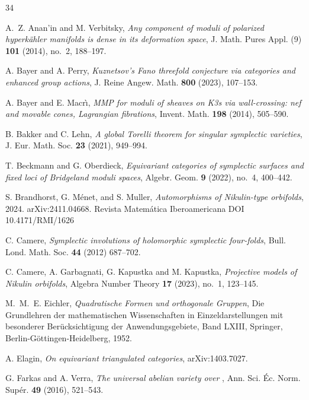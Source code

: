 \documentclass{amsart}
\makeatletter
\theoremstyle{definition}
\numberwithin{equation}{section}
\numberwithin{equation}{section} \theoremstyle{definition}
\newcounter{mathrecordid}
\newcommand{\mathboxbegin}[1]{%
  \stepcounter{mathrecordid}%
  \immediate\write\mathrecords{\themathrecordid,#1}%
  \special{pdf:bann << /Type /Annot /Subtype /Link /Border [0 0 0]
    /MathBoxID \themathrecordid /F 2
    /A << /S /URI /URI (urn:mathbox:\themathrecordid) >> >>}}
\newcommand{\mathboxinlineplain}[1]{$#1$}
\newcommand{\mathboxinline}[1]{%
  $\mathboxbegin{inline}%
  \special{pdf:literal direct /MathBoxBegin\themathrecordid\space MP}%
  #1\special{pdf:literal direct /MathBoxEnd\themathrecordid\space MP}%
  \special{pdf:eann}$}
\newcommand{\recordmath}{%
  \ifmeasuring@\expandafter\mathboxinlineplain
  \else\expandafter\mathboxinline\fi}
\makeatother
\begin{document}
\begin{thebibliography}{34}

 A.~Z. Anan'in and M. Verbitsky,
  \emph{Any component of moduli of polarized hyperk\"ahler manifolds is dense
  in its deformation space}, J. Math. Pures Appl. (9) {\bf 101} (2014),
  no.~2, 188--197.

 A. Bayer and A. Perry,
  \emph{Kuznetsov's Fano threefold conjecture via \recordmath{K3} categories and enhanced
  group actions}, J. Reine Angew. Math. {\bf 800} (2023), 107--153.

 A. Bayer and E. Macr\`\i,
  \emph{MMP for moduli of sheaves on K3s via wall-crossing: nef and movable
  cones, Lagrangian fibrations}, Invent. Math. {\bf 198} (2014), 505--590.



 B. Bakker and C. Lehn,
  \emph{A global Torelli theorem for singular symplectic varieties},
  J. Eur. Math. Soc. {\bf 23} (2021), 949--994.

 T. Beckmann and G. Oberdieck,
  \emph{Equivariant categories of symplectic surfaces and fixed loci of
  Bridgeland moduli spaces}, Algebr. Geom. {\bf 9} (2022), no.~4, 400--442.

 S. Brandhorst, G. M\'enet, and S. Muller,
  \emph{Automorphisms of Nikulin-type orbifolds}, 2024. arXiv:2411.04668. Revista Matemática Iberoamericana DOI
10.4171/RMI/1626

 C. Camere, \emph{Symplectic involutions of holomorphic symplectic four-folds}, Bull. Lond. Math.
Soc. {\bf 44} (2012) 687--702.

 C. Camere, A. Garbagnati, G. Kapustka and M. Kapustka, 
  \emph{Projective models of Nikulin orbifolds}, Algebra Number Theory {\bf 17}
  (2023), no.~1, 123--145. %

 M.~M.~E. Eichler, {\it Quadratische Formen und orthogonale Gruppen}, Die Grundlehren der mathematischen Wissenschaften in Einzeldarstellungen mit besonderer Ber\"ucksichtigung der Anwendungsgebiete, Band LXIII, Springer, Berlin-G\"ottingen-Heidelberg, 1952.

 A. Elagin,
  \emph{On equivariant triangulated categories}, arXiv:1403.7027.

 G. Farkas and A. Verra,
  \emph{The universal abelian variety over \recordmath{\mathcal{A}_5}},
  Ann. Sci. \'Ec. Norm. Sup\'er. {\bf 49} (2016), 521--543.


\end{thebibliography}
\end{document}
